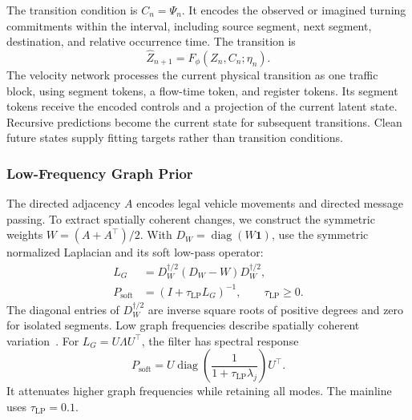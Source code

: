 The transition condition is $C_n=\Psi_n$. It encodes the observed or
imagined turning commitments within the interval, including source
segment, next segment, destination, and relative occurrence time.
The transition is
\begin{equation}
 \widehat Z_{n+1}=F_\phi(Z_n,C_n;\eta_n).
 \label{eq:causal-macro-history}
\end{equation}
The velocity network processes the current physical transition as one
traffic block, using segment tokens, a flow-time token, and register
tokens. Its segment tokens receive the encoded controls and a projection
of the current latent state. Recursive predictions become the current
state for subsequent transitions. Clean future states supply fitting
targets rather than transition conditions.

\subsubsection{Low-Frequency Graph Prior}

The directed adjacency $A$ encodes legal vehicle movements and directed
message passing. To extract spatially coherent changes, we construct
the symmetric weights $W=(A+A^\top)/2$. With
$D_W=\operatorname{diag}(W\mathbf1)$, use the symmetric normalized
Laplacian and its soft low-pass operator:
\begin{equation}
 \begin{aligned}
 L_G&=D_W^{\dagger/2}(D_W-W)D_W^{\dagger/2},\\
 P_{\mathrm{soft}}&=(I+\tau_{\mathrm{LP}}L_G)^{-1},
 \qquad \tau_{\mathrm{LP}}\geq0.
 \end{aligned}
 \label{eq:prior-spectral-operator}
\end{equation}
The diagonal entries of $D_W^{\dagger/2}$ are inverse square roots of
positive degrees and zero for isolated segments. Low graph frequencies
describe spatially coherent variation~\cite{shuman2013emerging}.
For $L_G=U\Lambda U^\top$, the filter has spectral response
\begin{equation}
 P_{\mathrm{soft}}
   =U\operatorname{diag}\!\left(
      \frac{1}{1+\tau_{\mathrm{LP}}\lambda_j}
     \right)U^\top.
 \label{eq:soft-low-frequency-filter}
\end{equation}
It attenuates higher graph frequencies while retaining all modes.
The mainline uses $\tau_{\mathrm{LP}}=0.1$.

